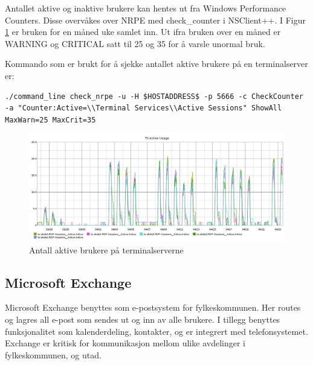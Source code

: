 Antallet aktive og inaktive brukere kan hentes ut fra Windows Performance Counters. Disse overvåkes over NRPE med check\_counter i NSClient++. I Figur \ref{ts-skole-usage} er bruken for en måned uke samlet inn. Ut ifra bruken over en måned er WARNING og CRITICAL satt til 25 og 35 for å varsle unormal bruk.

Kommando som er brukt for å sjekke antallet aktive brukere på en terminalserver er:
 
\begin{lstlisting}[style=example]
./command_line check_nrpe -u -H $HOSTADDRESS$ -p 5666 -c CheckCounter -a "Counter:Active=\\Terminal Services\\Active Sessions" ShowAll MaxWarn=25 MaxCrit=35
\end{lstlisting}

\begin{figure}[H]
	\centering
	\includegraphics[width=1.0\textwidth]{img/ts-skole-usage-inv}
	\caption{Antall aktive brukere på terminalserverne}
	\label{ts-skole-usage}
\end{figure}

\subsection{Microsoft Exchange}
Microsoft Exchange benyttes som e-postsystem for fylkeskommunen. Her routes og lagres all e-post som sendes ut og inn av alle brukere. I tillegg benyttes funksjonalitet som kalenderdeling, kontakter, og er integrert med telefonsystemet. Exchange er kritisk for kommunikasjon mellom ulike avdelinger i fylkeskommunen, og utad. 


